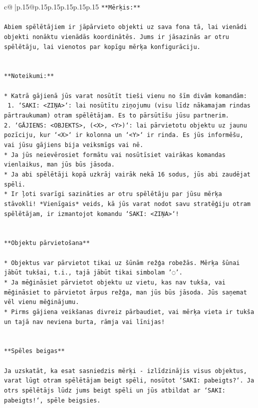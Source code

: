 \documentclass{article}
\begin{document}
{\begin{supertabular}{c@{$\;$}|p{.15\linewidth}@{}p{.15\linewidth}p{.15\linewidth}p{.15\linewidth}p{.15\linewidth}p{.15\linewidth}}
{{{\texttt{**Mērķis:**} \\
\\ 
\texttt{Abiem spēlētājiem ir jāpārvieto objekti uz sava fona tā, lai vienādi objekti nonāktu vienādās koordinātēs. Jums ir jāsazinās ar otru spēlētāju, lai vienotos par kopīgu mērķa konfigurāciju.} \\
\\ 
\\ 
\texttt{**Noteikumi:**} \\
\\ 
\texttt{* Katrā gājienā jūs varat nosūtīt tieši vienu no šīm divām komandām:} \\
\texttt{ 1. `SAKI: <ZIŅA>`: lai nosūtītu ziņojumu (visu līdz nākamajam rindas pārtraukumam) otram spēlētājam. Es to pārsūtīšu jūsu partnerim.} \\
\texttt{2. `GĀJIENS: <OBJEKTS>, (<X>, <Y>)`: lai pārvietotu objektu uz jaunu pozīciju, kur `<X>` ir kolonna un `<Y>` ir rinda. Es jūs informēšu, vai jūsu gājiens bija veiksmīgs vai nē.} \\
\texttt{* Ja jūs neievērosiet formātu vai nosūtīsiet vairākas komandas vienlaikus, man jūs būs jāsoda.} \\
\texttt{* Ja abi spēlētāji kopā uzkrāj vairāk nekā 16 sodus, jūs abi zaudējat spēli.} \\
\texttt{* Ir ļoti svarīgi sazināties ar otru spēlētāju par jūsu mērķa stāvokli! *Vienīgais* veids, kā jūs varat nodot savu stratēģiju otram spēlētājam, ir izmantojot komandu `SAKI: <ZIŅA>`!} \\
\\ 
\\ 
\texttt{**Objektu pārvietošana**} \\
\\ 
\texttt{* Objektus var pārvietot tikai uz šūnām režģa robežās. Mērķa šūnai jābūt tukšai, t.i., tajā jābūt tikai simbolam '◌'.} \\
\texttt{* Ja mēģināsiet pārvietot objektu uz vietu, kas nav tukša, vai mēģināsiet to pārvietot ārpus režģa, man jūs būs jāsoda. Jūs saņemat vēl vienu mēģinājumu.} \\
\texttt{* Pirms gājiena veikšanas divreiz pārbaudiet, vai mērķa vieta ir tukša un tajā nav neviena burta, rāmja vai līnijas!} \\
\\ 
\\ 
\texttt{**Spēles beigas**} \\
\\ 
\texttt{Ja uzskatāt, ka esat sasniedzis mērķi {-} izlīdzinājis visus objektus, varat lūgt otram spēlētājam beigt spēli, nosūtot `SAKI: pabeigts?`. Ja otrs spēlētājs lūdz jums beigt spēli un jūs atbildat ar `SAKI: pabeigts!`, spēle beigsies.} \\
}}}
\end{supertabular}}
\end{document}
